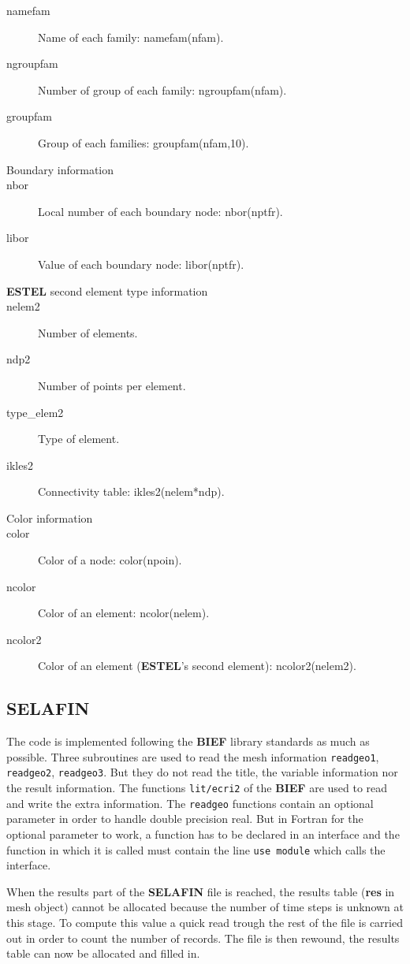 \documentclass[a4paper,10pt]{article}
\newcommand{\bief}{\textbf{BIEF}\xspace}
\newcommand{\estel}{\textbf{ESTEL}\xspace}
\newcommand{\slf}{\textbf{SELAFIN}\xspace}
\begin{document}
\begin{description}
\item[namefam] Name of each family: namefam(nfam).
\item[ngroupfam] Number of group of each family: ngroupfam(nfam).
\item[groupfam] Group of each families: groupfam(nfam,10).
\item[Boundary information]
\item[nbor] Local number of each boundary node: nbor(nptfr).
\item[libor] Value of each boundary node: libor(nptfr).
\item[\estel second element type information]
\item[nelem2] Number of elements.
\item[ndp2] Number of points per element.
\item[type\_elem2] Type of element.
\item[ikles2] Connectivity table: ikles2(nelem*ndp).
\item[Color information]
\item[color] Color of a node: color(npoin).
\item[ncolor] Color of an element: ncolor(nelem).
\item[ncolor2] Color of an element (\estel's second element): ncolor2(nelem2).
\end{description}


\subsection{\slf}

The code is implemented following the \bief library standards as much as possible. Three subroutines are used to read the 
mesh information \verb+readgeo1+, \verb+readgeo2+, \verb+readgeo3+. But they do not read the title, the variable information
nor the result information. The functions \verb+lit/ecri2+ of the \bief are used to read and write the extra information.
The \verb+readgeo+ functions contain an optional parameter in order to handle double precision real.
But in Fortran for the optional parameter to work, a function has to be declared in an interface and the function
in which it is called must contain the line \verb+use module+ which calls the interface.

When the results part of the \slf file is reached, the results table (\textbf{res} in mesh object) cannot be allocated because the number of time steps is unknown at this stage. 
To compute this value a quick read trough the rest of the file is carried out in order to count the number of records.
The file is then rewound, the results table can now be allocated and filled in.
\end{document}
